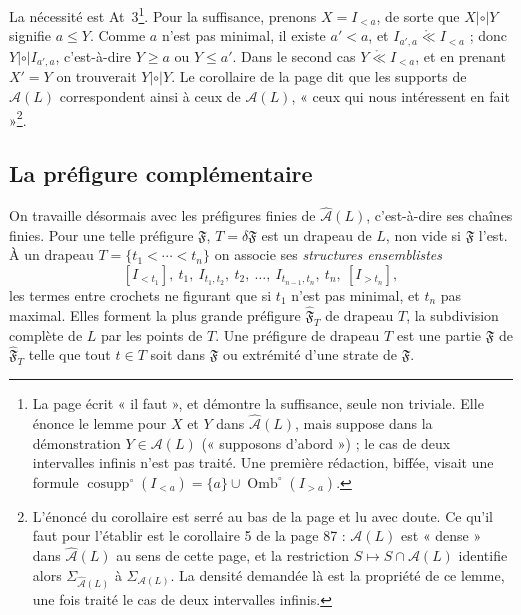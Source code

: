 \documentclass[11pt,a4paper]{article}
\begin{document}
La nécessité est At~3\footnote{La page écrit « il faut », et démontre la
suffisance, seule non triviale. Elle énonce le lemme pour $X$ et $Y$ dans
$\widehat{\mathcal{A}}(L)$, mais suppose dans la démonstration $Y \in
\mathcal{A}(L)$ (« supposons d'abord ») ; le cas de deux intervalles infinis
n'est pas traité. Une première rédaction, biffée, visait une formule
$\operatorname{cosupp}^{\circ}(I_{<a}) = \{a\} \cup
\operatorname{Omb}^{\circ}(I_{>a})$.}. Pour la suffisance, prenons $X = I_{<a}$,
de sorte que $X \mathrel{|\circ|} Y$ signifie $a \leq Y$. Comme $a$ n'est pas
minimal, il existe $a' < a$, et $I_{a',a} \mathrel{\mathring{\ll}} I_{<a}$ ;
donc $Y \mathrel{|\circ|} I_{a',a}$, c'est-à-dire $Y \geq a$ ou $Y \leq a'$.
Dans le second cas $Y \mathrel{\mathring{\ll}} I_{<a}$, et en prenant $X' = Y$
on trouverait $Y \mathrel{|\circ|} Y$. Le corollaire de la page dit que les
supports de $\widehat{\mathcal{A}}(L)$ correspondent ainsi à ceux de
$\mathcal{A}(L)$, « ceux qui nous intéressent en fait »\footnote{L'énoncé du
corollaire est serré au bas de la page et lu avec doute. Ce qu'il faut pour
l'établir est le corollaire 5 de la page 87 : $\mathcal{A}(L)$ est « dense »
dans $\widehat{\mathcal{A}}(L)$ au sens de cette page, et la restriction $S
\mapsto S \cap \mathcal{A}(L)$ identifie alors $\Sigma_{\widehat{\mathcal{A}}(L)}$
à $\Sigma_{\mathcal{A}(L)}$. La densité demandée là est la propriété
de ce lemme, une fois traité le cas de deux intervalles infinis.}.

\subsection*{La préfigure complémentaire}

On travaille désormais avec les préfigures finies de
$\widehat{\mathcal{A}}(L)$, c'est-à-dire ses chaînes finies. Pour une telle
préfigure $\mathfrak{F}$, $T = \delta \mathfrak{F}$ est un drapeau de $L$, non
vide si $\mathfrak{F}$ l'est. À un drapeau $T = \{t_{1} < \cdots < t_{n}\}$ on
associe ses \emph{structures ensemblistes}
\[
[I_{<t_{1}}],\ t_{1},\ I_{t_{1},t_{2}},\ t_{2},\ \ldots,\ I_{t_{n-1},t_{n}},\
t_{n},\ [I_{>t_{n}}],
\]
les termes entre crochets ne figurant que si $t_{1}$ n'est pas minimal, et $t_{n}$
pas maximal. Elles forment la plus grande préfigure $\widehat{\mathfrak{F}}_{T}$
de drapeau $T$, la subdivision complète de $L$ par les points de $T$. Une
préfigure de drapeau $T$ est une partie $\mathfrak{F}$ de
$\widehat{\mathfrak{F}}_{T}$ telle que tout $t \in T$ soit dans $\mathfrak{F}$
ou extrémité d'une strate de $\mathfrak{F}$.
\end{document}

